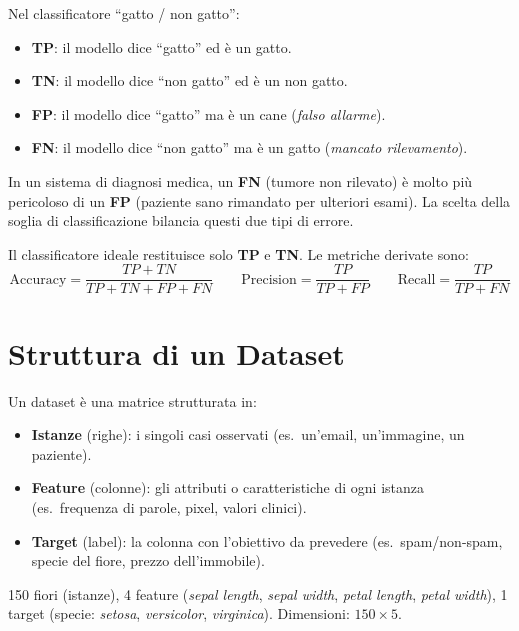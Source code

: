 \begin{exbox}
Nel classificatore ``gatto / non gatto'':
\begin{itemize}
    \item \textbf{TP}: il modello dice ``gatto'' ed è un gatto.
    \item \textbf{TN}: il modello dice ``non gatto'' ed è un non gatto.
    \item \textbf{FP}: il modello dice ``gatto'' ma è un cane (\emph{falso allarme}).
    \item \textbf{FN}: il modello dice ``non gatto'' ma è un gatto (\emph{mancato rilevamento}).
\end{itemize}
In un sistema di diagnosi medica, un \textbf{FN} (tumore non rilevato) è molto più pericoloso di un \textbf{FP} (paziente sano rimandato per ulteriori esami). La scelta della soglia di classificazione bilancia questi due tipi di errore.
\end{exbox}

Il classificatore ideale restituisce solo \textbf{TP} e \textbf{TN}. Le metriche derivate sono:
\[
\text{Accuracy} = \frac{TP + TN}{TP + TN + FP + FN}
\qquad
\text{Precision} = \frac{TP}{TP + FP}
\qquad
\text{Recall} = \frac{TP}{TP + FN}
\]

\section{Struttura di un Dataset}

Un dataset è una matrice strutturata in:
\begin{itemize}
    \item \textbf{Istanze} (righe): i singoli casi osservati (es.\ un'email, un'immagine, un paziente).
    \item \textbf{Feature} (colonne): gli attributi o caratteristiche di ogni istanza (es.\ frequenza di parole, pixel, valori clinici).
    \item \textbf{Target} (label): la colonna con l'obiettivo da prevedere (es.\ spam/non-spam, specie del fiore, prezzo dell'immobile).
\end{itemize}

\begin{exbox}
150 fiori (istanze), 4 feature (\emph{sepal length}, \emph{sepal width}, \emph{petal length}, \emph{petal width}), 1 target (specie: \emph{setosa}, \emph{versicolor}, \emph{virginica}). Dimensioni: $150 \times 5$.
\end{exbox}

